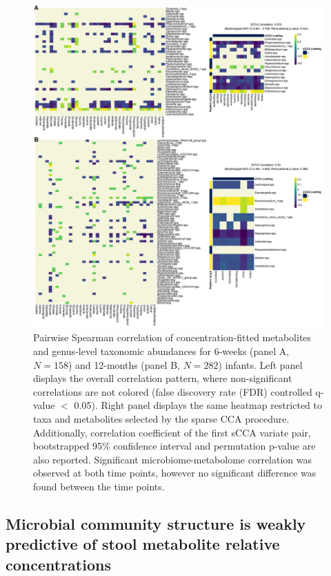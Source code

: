 \begin{figure}[!ht]
    \centering
    \includegraphics[width=\linewidth]{figures/ch2_f3.png}
    \caption[Pairwise Spearman correlation of concentration-fitted metabolites and genus-level taxonomic abundances for 6-weeks (panel A, $N = 158$) and 12-months (panel B, $N = 282$) infants]{Pairwise Spearman correlation of concentration-fitted metabolites and genus-level taxonomic abundances for 6-weeks (panel A, $N = 158$) and 12-months (panel B, $N = 282$) infants. Left panel displays the overall correlation pattern, where non-significant correlations are not colored (false discovery rate (FDR) controlled q-value $<$ 0.05). Right panel displays the same heatmap restricted to taxa and metabolites selected by the sparse CCA procedure. Additionally, correlation coefficient of the first sCCA variate pair, bootstrapped 95\% confidence interval and permutation p-value are also reported. Significant microbiome-metabolome correlation was observed at both time points, however no significant difference was found between the time points.}
    \label{fig:2.3}
\end{figure}

\subsection{Microbial community structure is weakly predictive of stool metabolite relative concentrations}


